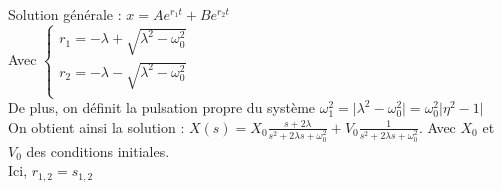 \documentclass[../main.tex]{subfiles}
\begin{document}
Solution générale : $x = A e^{r_1t} + B e^{r_2t}$\\
Avec $\begin{cases}
    r_1 = -\lambda + \sqrt{\lambda^2 - \omega_0^2}\\
    r_2 = -\lambda - \sqrt{\lambda^2 - \omega_0^2}\\
\end{cases}$\\
De plus, on définit la pulsation propre du système $\omega_1^2 = \lvert  \lambda^2 - \omega_0^2\rvert = \omega_0^2 \lvert \eta^2 - 1 \rvert$\\

On obtient ainsi la solution : $X(s) = X_0 \frac{s+ 2\lambda}{s^2 + 2\lambda s + \omega_0^2} + V_0 \frac{1}{s^2 + 2\lambda s + \omega_0^2}$. Avec $X_0$ et $V_0$ des conditions initiales.\\
Ici, $r_{1,2} = s_{1,2}$\\
\end{document}
